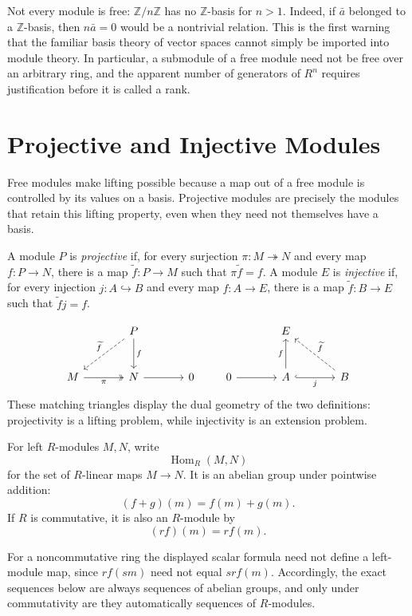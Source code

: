 Not every module is free: \(\mathbb Z/n\mathbb Z\) has no \(\mathbb Z\)-basis
for \(n>1\). Indeed, if \(\bar a\) belonged to a \(\mathbb Z\)-basis, then
\(n\bar a=0\) would be a nontrivial relation. This is the first warning that
the familiar basis theory of vector spaces cannot simply be imported into
module theory. In particular, a submodule of a free module need not be free
over an arbitrary ring, and the apparent number of generators of \(R^n\)
requires justification before it is called a rank.

\section{Projective and Injective Modules}
Free modules make lifting possible because a map out of a free module is
controlled by its values on a basis.  Projective modules are precisely the
modules that retain this lifting property, even when they need not themselves
have a basis.

\begin{definition}
A module \(P\) is \emph{projective} if, for every surjection
\(\pi:M\twoheadrightarrow N\) and every map \(f:P\to N\), there is a map
\(\widetilde f:P\to M\) such that \(\pi\widetilde f=f\).  A module \(E\) is
\emph{injective} if, for every injection \(j:A\hookrightarrow B\) and every
map \(f:A\to E\), there is a map \(\widetilde f:B\to E\) such that
\(\widetilde f j=f\).
\end{definition}
\[
\begin{tikzcd}[column sep=large,row sep=large]
&P\arrow[dl,dashed,"\widetilde f"']\arrow[d,"f"]\\
M\arrow[r,two heads,"\pi"']&N\arrow[r]&0
\end{tikzcd}
\qquad
\begin{tikzcd}[column sep=large,row sep=large]
&E\\
0\arrow[r]&A\arrow[u,"f"]\arrow[r,hook,"j"']&B\arrow[ul,dashed,"\widetilde f"']
\end{tikzcd}
\]
These matching triangles display the dual geometry of the two definitions:
projectivity is a lifting problem, while injectivity is an extension problem.

\begin{definition}
For left \(R\)-modules \(M,N\), write
\[
\operatorname{Hom}_R(M,N)
\]
for the set of \(R\)-linear maps \(M\to N\).  It is an abelian group under
pointwise addition:
\[
(f+g)(m)=f(m)+g(m).
\]
If \(R\) is commutative, it is also an \(R\)-module by
\[
(rf)(m)=r f(m).
\]
\end{definition}
For a noncommutative ring the displayed scalar formula need not define a
left-module map, since \(r f(sm)\) need not equal \(s r f(m)\).  Accordingly,
the exact sequences below are always sequences of abelian groups, and only
under commutativity are they automatically sequences of \(R\)-modules.

